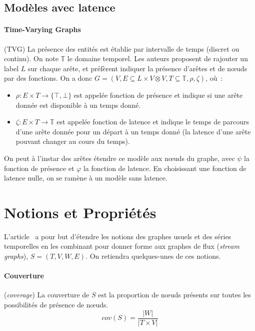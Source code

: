 \documentclass[12pt,a4paper]{article}
\begin{document}
\subsection{Modèles avec latence}

\paragraph{Time-Varying
  Graphs}\cite{DBLP:journals/paapp/CasteigtsFQS12}
(TVG) La présence des entités est établie par intervalle de temps
(discret ou continu). On note \(\mathbb{T}\) le domaine temporel. Les
auteurs proposent de rajouter un label \(L\) sur chaque arête, et
préfèrent indiquer la présence d'arêtes et de nœuds par des
fonctions. On a donc
\(G = (V, E \subseteq L \times V \otimes V, T \subseteq \mathbb{T},
\rho, \zeta)\), où~:
\begin{itemize}
\item \(\rho : E \times T \to \{\top, \bot\}\) est appelée fonction
  de présence et indique si une arête donnée est disponible à un temps
  donné.
\item \(\zeta : E \times T \to \mathbb{T}\) est appelée fonction de
  latence et indique le temps de parcours d'une arête donnée pour un
  départ à un temps donné (la latence d'une arête pouvant changer au
  cours du temps).
\end{itemize}

On peut à l'instar des arêtes étendre ce modèle aux nœuds du graphe,
avec \(\psi\) la fonction de présence et \(\varphi\) la fonction de
latence. En choisissant une fonction de latence nulle, on se ramène à
un modèle sans latence.

\section{Notions et Propriétés}

L'article~\cite{DBLP:journals/corr/abs-1710-04073} a pour but
d'étendre les notions des graphes usuels et des séries temporelles en
les combinant pour donner forme aux graphes de flux (\textit{stream
  graphs}), \(S = (T, V, W, E)\). On retiendra quelques-unes de ces
notions.

\paragraph{Couverture} (\textit{coverage}) La couverture de \(S\) est
la proportion de nœuds présents sur toutes les possibilités de
présence de nœuds.
\[cov(S) = \frac{|W|}{|T \times V|}\]
\end{document}
